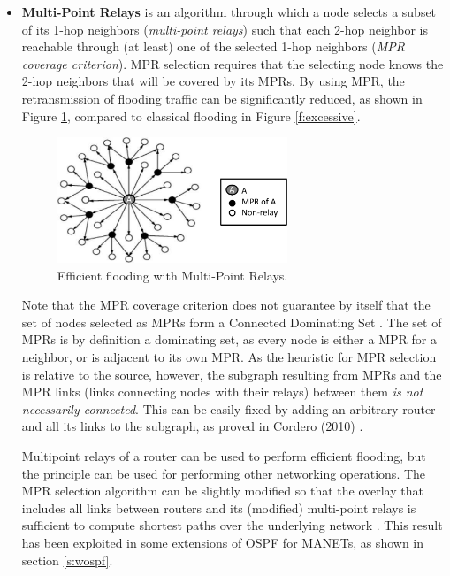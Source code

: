 \begin{itemize}
\item {\bf Multi-Point Relays} \cite{mpr-hicss2002} is an algorithm through which a node selects a subset of its 1-hop neighbors (\emph{multi-point relays}) such that each 2-hop neighbor is reachable through (at least) one of the selected 1-hop neighbors ({\em MPR coverage criterion}). MPR selection requires that the selecting node knows the 2-hop neighbors that will be covered by its MPRs. By using MPR, the retransmission of flooding traffic can be significantly reduced, as shown in Figure \ref{f:mpr}, compared to classical flooding in Figure \ref{f:excessive}. 

\begin{figure}[h]
\centering
\includegraphics[width=0.65\textwidth]{Figures/mpr-crop.pdf}
\caption{Efficient flooding with Multi-Point Relays.}
\label{f:mpr}
\end{figure}

	\begin{remark}
	Note that the MPR coverage criterion does not guarantee by itself that the set of nodes selected as MPRs form a Connected Dominating Set \cite{softcom10}. The set of MPRs is by definition a dominating set, as every node is either a MPR for a neighbor, or is adjacent to its own MPR. As the heuristic for MPR selection is relative to the source, however, the subgraph resulting from MPRs and the MPR links (links connecting nodes with their relays) between them {\em is not necessarily connected}. This can be easily fixed by adding an arbitrary router and all its links to the subgraph, as proved in Cordero (2010) \cite{softcom10}.
	\end{remark}


Multipoint relays of a router can be used to perform efficient flooding, but the principle can be used for performing other networking operations. The MPR selection algorithm can be slightly modified so that the overlay that includes all links between routers and its (modified) multi-point relays is sufficient to compute shortest paths over the underlying network \cite{softcom10}. This result has been exploited in some extensions of OSPF for MANETs, as shown in section \ref{s:wospf}.

\end{itemize}

